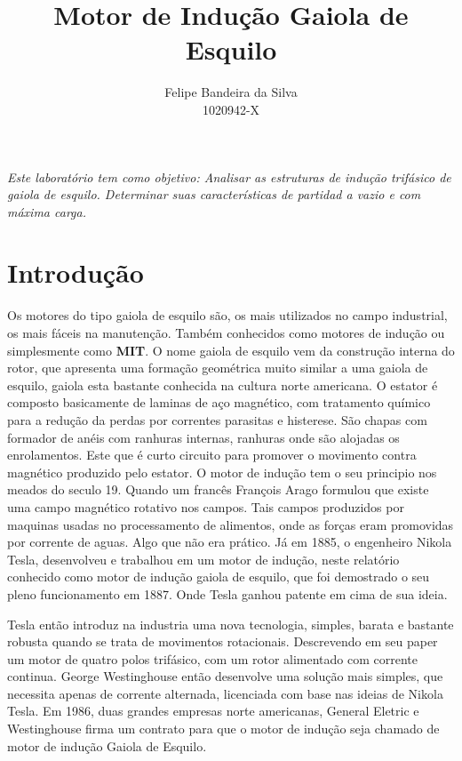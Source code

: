 \documentclass[10pt]{article}
\title{Motor de Indução Gaiola de Esquilo}
\author{Felipe Bandeira da Silva\\1020942-X}
\begin{document}
\maketitle


\textit{Este laboratório tem como objetivo: Analisar as estruturas de indução trifásico de gaiola de esquilo. Determinar suas características de partidad a vazio e com máxima carga.}

\newpage

\tableofcontents

\newpage



\newpage
\section{Introdução}

Os motores do tipo gaiola de esquilo são, os mais utilizados
no campo industrial, os mais fáceis na manutenção. Também
conhecidos como motores de indução ou simplesmente como \textbf{MIT}.
O nome gaiola de esquilo vem da construção interna do 
rotor, que apresenta uma formação geométrica muito similar
a uma gaiola de esquilo, gaiola esta bastante conhecida 
na cultura norte americana. 
O estator é composto basicamente de laminas de aço magnético, com tratamento químico para a redução da perdas por correntes parasitas e histerese. São chapas com formador de anéis com ranhuras internas, ranhuras onde são alojadas os enrolamentos. Este que é curto circuito para promover o movimento contra magnético produzido pelo estator. O motor de indução tem o seu principio nos meados do seculo 19.
Quando um francês François Arago formulou que existe uma campo magnético rotativo nos campos. Tais campos produzidos por maquinas usadas no processamento de alimentos, onde as forças eram promovidas por corrente de aguas. Algo que não era prático. Já em 1885, o engenheiro Nikola Tesla, desenvolveu e trabalhou em um motor de indução, neste relatório conhecido como motor de indução gaiola de esquilo, que foi demostrado o seu pleno funcionamento em 1887. Onde Tesla ganhou patente em cima de sua ideia.

Tesla então introduz na industria uma nova tecnologia, simples, barata e bastante robusta quando se trata de movimentos rotacionais. Descrevendo em seu paper um motor de quatro polos trifásico, com um rotor alimentado com corrente continua. George Westinghouse então desenvolve uma solução mais simples, que necessita apenas de corrente alternada, licenciada com base nas ideias de Nikola Tesla. Em 1986, duas grandes empresas norte americanas, General Eletric e Westinghouse firma um contrato para que o motor de indução seja chamado de motor de indução Gaiola de Esquilo.
\end{document}
